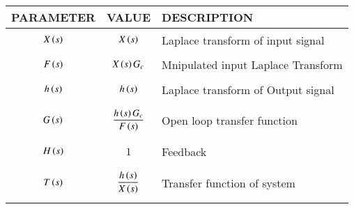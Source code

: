 \begin{tabular}{|p{2cm}|p{2cm}|p{4cm}|}
    \hline
    PARAMETER & VALUE & DESCRIPTION   \\ \hline
    $$X\left(s\right)$$ & $$X\left(s\right)$$ & Laplace transform of input signal  \\ \hline
    $$F\left(s\right)$$ & $$X\left(s\right)G_c$$ & Mnipulated input Laplace Transform \\ \hline
    $$h\left(s\right)$$ & $$h\left(s\right)$$ & Laplace transform of Output signal  \\ \hline
    $$G\left(s\right)$$ & $$\frac{h\left(s\right)G_c}{F\left(s\right)}$$ & Open loop transfer function    \\ \hline
    $$H\left(s\right)$$ & $$1$$ & Feedback  \\ \hline
    $$T\left(s\right)$$ & $$\frac{h\left(s\right)}{X\left(s\right)}$$ & Transfer function of system   \\ \hline
\end{tabular}
